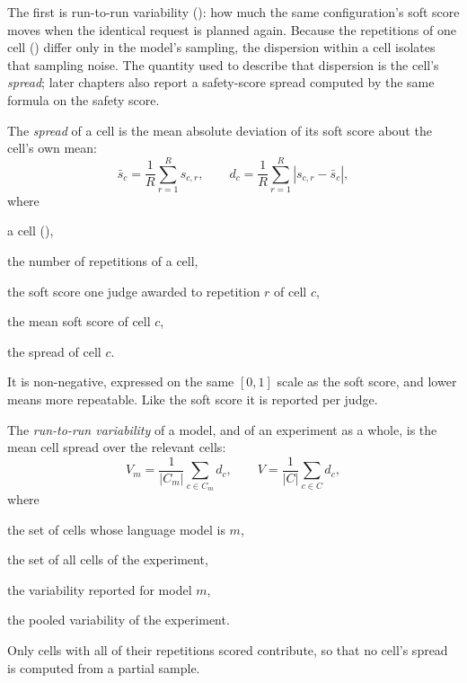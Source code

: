 The first is run-to-run variability (): how much the same configuration's soft score moves when the identical request is planned again. Because the repetitions of one cell () differ only in the model's sampling, the dispersion within a cell isolates that sampling noise. The quantity used to describe that dispersion is the cell's \emph{spread}; later chapters also report a safety-score spread computed by the same formula on the safety score.

\begin{definition}
    \label{def:spread}
    The \emph{spread} of a cell is the mean absolute deviation of its soft score about the cell's own mean:
    \[
        \bar{s}_c = \frac{1}{R} \sum_{r=1}^{R} s_{c,r},
        \qquad
        d_c = \frac{1}{R} \sum_{r=1}^{R} \left| s_{c,r} - \bar{s}_c \right|,
    \]
    where
    \begin{eqwhere}[1.6cm]
        \item[\(c\)] a cell (),
        \item[\(R\)] the number of repetitions of a cell,
        \item[\(s_{c,r}\)] the soft score one judge awarded to repetition \( r \) of cell \( c \),
        \item[\(\bar{s}_c\)] the mean soft score of cell \( c \),
        \item[\(d_c\)] the spread of cell \( c \).
    \end{eqwhere}
    It is non-negative, expressed on the same $[0, 1]$ scale as the soft score, and lower means more repeatable. Like the soft score it is reported per judge.
\end{definition}

\begin{definition}
    \label{def:variability}
    The \emph{run-to-run variability} of a model, and of an experiment as a whole, is the mean cell spread over the relevant cells:
    \[
        V_m = \frac{1}{\left| C_m \right|} \sum_{c \in C_m} d_c,
        \qquad
        V = \frac{1}{\left| C \right|} \sum_{c \in C} d_c,
    \]
    where
    \begin{eqwhere}[1.6cm]
        \item[\(C_m\)] the set of cells whose language model is \( m \),
        \item[\(C\)] the set of all cells of the experiment,
        \item[\(V_m\)] the variability reported for model \( m \),
        \item[\(V\)] the pooled variability of the experiment.
    \end{eqwhere}
    Only cells with all of their repetitions scored contribute, so that no cell's spread is computed from a partial sample.
\end{definition}

